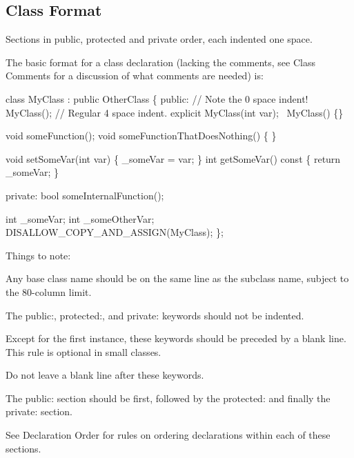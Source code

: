 \subsection*{Class Format}

Sections in public, protected and private order, each indented one space.

The basic format for a class declaration (lacking the comments, see Class Comments for a discussion of what comments are needed) is\+:


\begin{DoxyCode}
\textcolor{keyword}{class }MyClass : \textcolor{keyword}{public} OtherClass
\{
\textcolor{keyword}{public}:      \textcolor{comment}{// Note the 0 space indent!}
    MyClass();  \textcolor{comment}{// Regular 4 space indent.}
    \textcolor{keyword}{explicit} MyClass(\textcolor{keywordtype}{int} var);
    ~MyClass() \{\}

    \textcolor{keywordtype}{void} someFunction();
    \textcolor{keywordtype}{void} someFunctionThatDoesNothing() \{
    \}

    \textcolor{keywordtype}{void} setSomeVar(\textcolor{keywordtype}{int} var) \{ \_someVar = var; \}
    \textcolor{keywordtype}{int} getSomeVar()\textcolor{keyword}{ const }\{ \textcolor{keywordflow}{return} \_someVar; \}

\textcolor{keyword}{private}:
    \textcolor{keywordtype}{bool} someInternalFunction();

    \textcolor{keywordtype}{int} \_someVar;
    \textcolor{keywordtype}{int} \_someOtherVar;
    DISALLOW\_COPY\_AND\_ASSIGN(MyClass);
\};
\end{DoxyCode}


Things to note\+:


\begin{DoxyItemize}
\item Any base class name should be on the same line as the subclass name, subject to the 80-\/column limit.
\item The {\ttfamily public\+:}, {\ttfamily protected\+:}, and {\ttfamily private\+:} keywords should not be indented.
\item Except for the first instance, these keywords should be preceded by a blank line. This rule is optional in small classes.
\item Do not leave a blank line after these keywords.
\item The {\ttfamily public\+:} section should be first, followed by the {\ttfamily protected\+:} and finally the {\ttfamily private\+:} section.
\item See Declaration Order for rules on ordering declarations within each of these sections.
\end{DoxyItemize}

